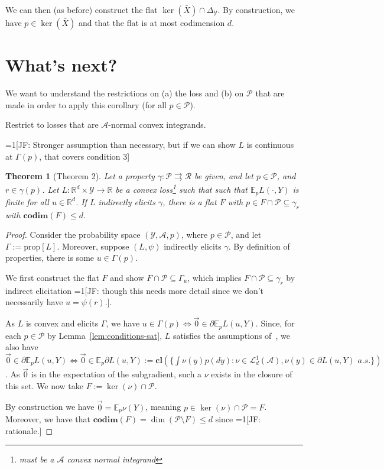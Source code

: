 \documentclass[12pt]{article}
\newcommand{\Comments}{1}
\newcommand{\mynote}[2]{\ifnum\Comments=1\textcolor{#1}{#2}\fi}
\newcommand{\jessie}[1]{\mynote{green!75!black}{[JF: #1]}}
\newcommand{\reals}{\mathbb{R}}
\newcommand{\toto}{\rightrightarrows}
\newcommand{\A}{\mathcal{A}}
\newcommand{\E}{\mathbb{E}}
\renewcommand{\L}{\mathcal{L}}
\renewcommand{\P}{\mathcal{P}}
\newcommand{\R}{\mathcal{R}}
\newcommand{\Y}{\mathcal{Y}}
\newcommand{\cl}{\mathbf{cl}}
\newcommand{\codim}{\mathbf{codim}}
\newcommand{\prop}[1]{\mathrm{prop}[#1]}
\newtheorem{theorem}{Theorem}
\begin{document}
We can then (as before) construct the flat $ \ker(\bar X) \cap \Delta_{\mathcal{Y}}$.  
By construction, we have $p \in \ker(\bar X)$ and that the flat is at most codimension $d$.

\section{What's next?}
We want to understand the restrictions on (a) the loss and (b) on $\P$ that are made in order to apply this corollary (for all $p\in \P$).

Restrict to losses that are $\A$-normal convex integrands.


\jessie{Stronger assumption than necessary, but if we can show $L$ is continuous at $\Gamma(p)$, that covers condition 3}

\begin{theorem}[Theorem 2]
	Let a property $\gamma : \P \toto \R$ be given, and let $p \in \P$, and $r \in \gamma(p)$.
	Let $L : \reals^d \times \Y \to \reals$ be a convex loss\footnote{must be a $\A$ convex normal integrand} such that such that $\E_p L(\cdot,Y)$ is finite for all $u \in \reals^d$.
	If $L$ indirectly elicits $\gamma$, there is a flat $F$ with $p \in F \cap \P \subseteq \gamma_r$ with $\codim(F) \leq d$.
\end{theorem}
\begin{proof}
	Consider the probability space $(\Y, \A, p)$, where $p \in \P$, and let $\Gamma := \prop{L}$.
	Moreover, suppose $(L, \psi)$ indirectly elicits $\gamma$.
	By definition of properties, there is some $u \in \Gamma(p)$.
	
	We first construct the flat $F$ and show $F \cap \P \subseteq \Gamma_u$, which implies $F \cap \P \subseteq \gamma_r$ by indirect elicitation \jessie{though this needs more detail since we don't necessarily have $u = \psi(r)$.}. 
	
	As $L$ is convex and elicits $\Gamma$, we have $u \in \Gamma(p) \iff \vec 0 \in \partial \E_p L(u,Y)$.
	Since, for each $p \in \P$ by Lemma~\ref{lem:conditions-sat}, $L$ satisfies the assumptions of~\cite[Corollary 1]{rockafellar1982interchange}, we also have $\vec 0 \in \partial \E_p L(u,Y) \iff \vec 0 \in \E_p \partial L(u,Y) := \cl(\{\int \nu(y) p(dy) : \nu \in \L^1_d(\A), \nu(y) \in \partial L(u,Y)\,\, a.s.\})$.
	As $\vec 0$ is in the expectation of the subgradient, such a $\nu$ exists in the closure of this set.
	We now take $F := \ker(\nu) \cap \P$.
	
	By construction we have $\vec 0 = \E_p \nu(Y)$, meaning $p \in \ker(\nu) \cap \P = F$.
	Moreover, we have that $\codim(F) = \dim(\P \setminus F) \leq d$ since \jessie{rationale.}
\end{proof}
\end{document}
